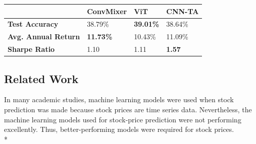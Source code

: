 \documentclass[]{article}
\begin{document}
\begin{table}[H]
    \centering
    \begin{tabular}{|l|l|l|l|}
    \hline
        ~ & \textbf{ConvMixer} & \textbf{ViT} & \textbf{CNN-TA} \\ \hline
        \textbf{Test Accuracy} & 38.79\% & \textbf{39.01\%} & 38.64\% \\ \hline
        \textbf{Avg. Annual Return} & \textbf{11.73\%} & 10.43\% & 11.09\% \\ \hline
        \textbf{Sharpe Ratio} & 1.10 & 1.11 & \textbf{1.57} \\ \hline
    \end{tabular}
\end{table}

\begin{center}
    \item\section{Related Work}
\end{center}
In many academic studies, machine learning models were used when stock prediction was made because stock prices are time series data. Nevertheless, the machine learning models used for stock-price prediction were not performing excellently. Thus, better-performing models were required for stock prices.\vspace{0.2cm} \\*
\end{document}
